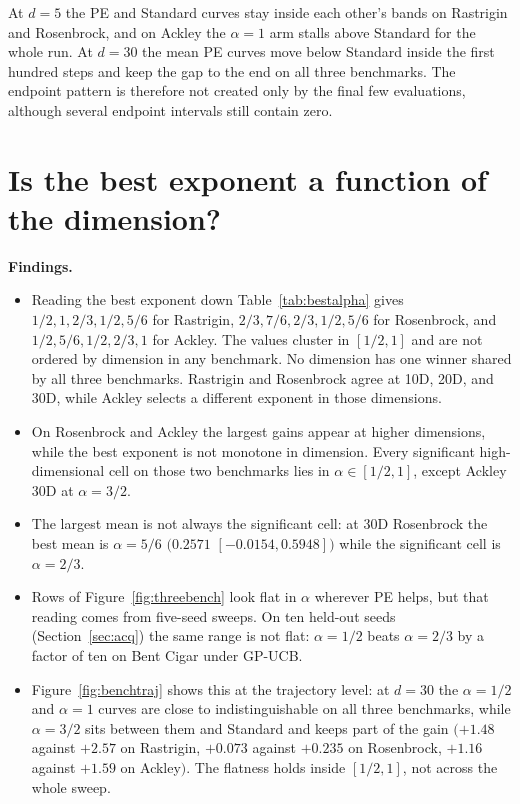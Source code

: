 \documentclass[11pt]{article}
\newcommand{\findings}{\textbf{Findings.}}
\begin{document}
At $d=5$ the PE and Standard curves stay inside each other's bands on Rastrigin and
Rosenbrock, and on Ackley the $\alpha=1$ arm stalls above Standard for the whole
run. At $d=30$ the mean PE curves move below Standard inside the first hundred
steps and keep the gap to the end on all three benchmarks. The endpoint pattern
is therefore not created only by the final few evaluations, although several
endpoint intervals still contain zero.

\section{Is the best exponent a function of the dimension?}
\label{sec:dimalpha}

\findings
\begin{itemize}
  \item Reading the best exponent down Table~\ref{tab:bestalpha} gives
        $1/2,\allowbreak 1,\allowbreak 2/3,\allowbreak 1/2,\allowbreak 5/6$ for
        Rastrigin, $2/3,\allowbreak 7/6,\allowbreak 2/3,\allowbreak
        1/2,\allowbreak 5/6$ for Rosenbrock, and $1/2,\allowbreak
        5/6,\allowbreak 1/2,\allowbreak 2/3,\allowbreak 1$ for Ackley. The
        values cluster in $[1/2, 1]$ and are not ordered by dimension in any benchmark. No
        dimension has one winner shared by all three benchmarks. Rastrigin
        and Rosenbrock agree at 10D, 20D, and 30D, while Ackley selects a
        different exponent in those dimensions.
  \item On Rosenbrock and Ackley the largest gains appear at higher dimensions,
        while the best exponent is not monotone in dimension. Every significant
        high-dimensional cell on those two
        benchmarks lies in $\alpha\in[1/2,1]$, except Ackley 30D at
        $\alpha=3/2$.
  \item The largest mean is not always the significant cell: at 30D Rosenbrock
        the best mean is $\alpha=5/6$ $(0.2571$ $[-0.0154, 0.5948])$ while the
        significant cell is $\alpha=2/3$.
  \item Rows of Figure~\ref{fig:threebench} look flat in $\alpha$ wherever PE
        helps, but that reading comes from five-seed sweeps. On ten held-out
        seeds (Section~\ref{sec:acq}) the same range is not flat: $\alpha=1/2$
        beats $\alpha=2/3$ by a factor of ten on Bent Cigar under GP-UCB.
  \item Figure~\ref{fig:benchtraj} shows this at the trajectory level: at $d=30$
        the $\alpha=1/2$ and $\alpha=1$ curves are close to indistinguishable on
        all three benchmarks, while $\alpha=3/2$ sits between them and Standard
        and keeps part of the gain $(+1.48$ against $+2.57$ on Rastrigin,
        $+0.073$ against $+0.235$ on Rosenbrock, $+1.16$ against $+1.59$ on
        Ackley$)$. The flatness holds inside $[1/2,1]$, not across the whole
        sweep.
\end{itemize}
\end{document}
